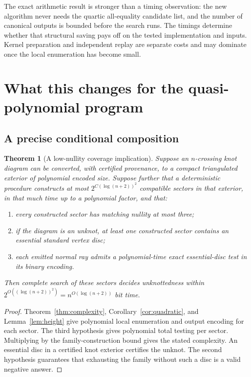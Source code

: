 \documentclass[11pt,letterpaper]{article}
\newtheorem{theorem}{Theorem}[section]
\theoremstyle{definition}
\theoremstyle{remark}\newtheorem{remark}[theorem]{Remark}
\begin{document}


The exact arithmetic result is stronger than a timing observation: the
new algorithm never needs the quartic all-equality candidate list, and
the number of canonical outputs is bounded before the search runs.
The timings determine whether that structural saving pays off on the
tested implementation and inputs. Kernel preparation and independent
replay are separate costs and may dominate once the local enumeration
has become small.

\section{What this changes for the quasi-polynomial program}
\label{sec:global}

\subsection{A precise conditional composition}

\begin{theorem}[A low-nullity coverage implication]
\label{thm:conditional}
Suppose an $n$-crossing knot diagram can be converted, with certified
provenance, to a compact triangulated exterior of polynomial encoded size.
Suppose further that a deterministic procedure constructs at most
$2^{C(\log(n+2))^2}$ compatible sectors in that exterior, in that much
time up to a polynomial factor, and that:
\begin{enumerate}
\item every constructed sector has matching nullity at most three;
\item if the diagram is an unknot, at least one constructed sector contains
an essential standard vertex disc;
\item each emitted normal ray admits a polynomial-time exact essential-disc
test in its binary encoding.
\end{enumerate}
Then complete search of these sectors decides unknottedness within
$2^{O((\log(n+2))^2)}=n^{O(\log(n+2))}$ bit time.
\end{theorem}

\begin{proof}
Theorem~\ref{thm:complexity}, Corollary~\ref{cor:quadratic}, and
Lemma~\ref{lem:height} give polynomial local enumeration and output
encoding for each sector. The third hypothesis gives polynomial total
testing per sector. Multiplying by the family-construction bound gives
the stated complexity. An essential disc in a certified knot exterior
certifies the unknot. The second hypothesis guarantees that exhausting
the family without such a disc is a valid negative answer.
\end{proof}
\end{document}
